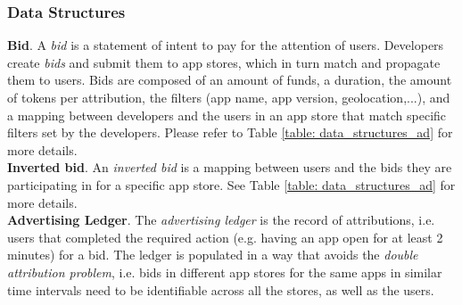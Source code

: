 \subsubsection{Data Structures}
\label{sssec:ads_ds}

\noindent \textbf{Bid}. A \textit{bid} is a statement of intent to pay for the attention of users. Developers create \textit{bids} and submit them to app stores, which in turn match and propagate them to users. Bids are composed of an amount of funds, a duration, the amount of tokens per attribution, the filters (app name, app version, geolocation,...), and a mapping between developers and the users in an app store that match specific filters set by the developers. Please refer to Table \ref{table: data_structures_ad} for more details. \\

\noindent \textbf{Inverted bid}. An \textit{inverted bid} is a mapping between users and the bids they are participating in for a specific app store. See Table \ref{table: data_structures_ad} for more details.\\

\noindent \textbf{Advertising Ledger}. The \textit{advertising ledger} is the record of attributions, i.e. users that completed the required action (e.g. having an app open for at least 2 minutes) for a bid. The ledger is populated in a way that avoids the \textit{double attribution problem}, i.e. bids in different app stores for the same apps in similar time intervals need to be identifiable across all the stores, as well as the users.

